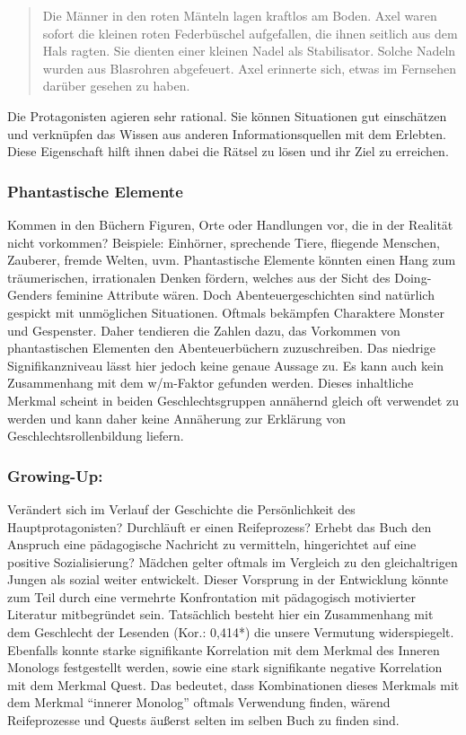 \begin{quote}
Die Männer in den roten Mänteln lagen kraftlos am Boden. \textelp{} Axel
waren sofort die kleinen roten Federbüschel aufgefallen, die ihnen
seitlich aus dem Hals ragten. Sie dienten einer kleinen Nadel als
Stabilisator. Solche Nadeln wurden aus Blasrohren abgefeuert. Axel
erinnerte sich, etwas im Fernsehen darüber gesehen zu haben.
\parencite[][117]{Brezina2010}
\end{quote}

Die Protagonisten agieren sehr rational. Sie können Situationen gut
einschätzen und verknüpfen das Wissen aus anderen Informationsquellen
mit dem Erlebten. Diese Eigenschaft hilft ihnen dabei die Rätsel zu
lösen und ihr Ziel zu erreichen.

\subsubsection{Phantastische Elemente}

Kommen in den Büchern Figuren, Orte oder Handlungen vor, die in der
Realität nicht vorkommen? Beispiele: Einhörner, sprechende Tiere,
fliegende Menschen, Zauberer, fremde Welten, uvm. Phantastische Elemente
könnten einen Hang zum träumerischen, irrationalen Denken fördern,
welches aus der Sicht des Doing-Genders feminine Attribute wären. Doch
Abenteuergeschichten sind natürlich gespickt mit unmöglichen
Situationen. Oftmals bekämpfen Charaktere Monster und Gespenster. Daher
tendieren die Zahlen dazu, das Vorkommen von phantastischen Elementen
den Abenteuerbüchern zuzuschreiben. Das niedrige Signifikanzniveau lässt
hier jedoch keine genaue Aussage zu. Es kann auch kein Zusammenhang mit
dem w/m-Faktor gefunden werden. Dieses inhaltliche Merkmal scheint in
beiden Geschlechtsgruppen annähernd gleich oft verwendet zu werden und
kann daher keine Annäherung zur Erklärung von Geschlechtsrollenbildung
liefern.

\subsubsection{Growing-Up:}

Verändert sich im Verlauf der Geschichte die Persönlichkeit des
Hauptprotagonisten? Durchläuft er einen Reifeprozess? Erhebt das Buch
den Anspruch eine pädagogische Nachricht zu vermitteln, hingerichtet auf
eine positive Sozialisierung? Mädchen gelter oftmals im Vergleich zu den
gleichaltrigen Jungen als sozial weiter entwickelt. Dieser Vorsprung in
der Entwicklung könnte zum Teil durch eine vermehrte Konfrontation mit
pädagogisch motivierter Literatur mitbegründet sein. Tatsächlich besteht
hier ein Zusammenhang mit dem Geschlecht der Lesenden (Kor.: 0,414*) die
unsere Vermutung widerspiegelt. Ebenfalls konnte starke signifikante
Korrelation mit dem Merkmal des Inneren Monologs festgestellt werden,
sowie eine stark signifikante negative Korrelation mit dem Merkmal
Quest. Das bedeutet, dass Kombinationen dieses Merkmals mit dem Merkmal
``innerer Monolog'' oftmals Verwendung finden, wärend Reifeprozesse und
Quests äußerst selten im selben Buch zu finden sind.

